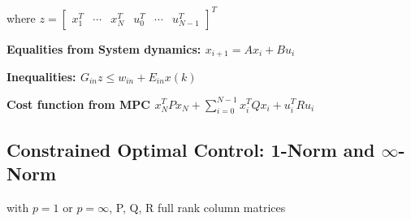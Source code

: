 \documentclass[8pt,a4paper]{scrartcl}
\begin{document}
\begin{multicols*}{3}
\begin{multicols*}{4}
where $z=\begin{bmatrix}x_1^T&\cdots&x_N^T&u_0^T&\cdots&u_{N-1}^T\end{bmatrix}^T$

\finn

\textbf{Equalities from System dynamics: $x_{i+1}=Ax_i+Bu_i$}


\textbf{Inequalities: $G_{in}z\leq w_{in}+E_{in}x(k)$}



\textbf{Cost function from MPC $x_N^TPx_N+\sum\limits_{i=0}^{N-1}x_i^TQx_i+u_i^TRu_i$}



\subsection{Constrained Optimal Control: 1-Norm and $\infty$-Norm}



with $p=1$ or $p=\infty$, P, Q, R full rank column matrices
\end{multicols*}
\end{multicols*}
\end{document}
